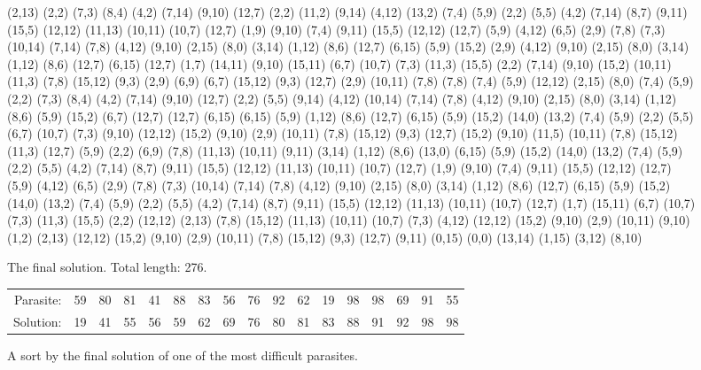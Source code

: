\documentclass[11pt]{article}
\begin{document}
\begin{figure}[H]
  \begin{adjustwidth}{.5in}{.5in}
    \begin{footnotesize}
      (2,13) (2,2) (7,3) (8,4) (4,2) (7,14) (9,10) (12,7) (2,2) (11,2) (9,14) (4,12) (13,2) (7,4) (5,9) (2,2) (5,5) (4,2) (7,14) (8,7) (9,11) (15,5) (12,12) (11,13) (10,11) (10,7) (12,7) (1,9) (9,10) (7,4) (9,11) (15,5) (12,12) (12,7) (5,9) (4,12) (6,5) (2,9) (7,8) (7,3) (10,14) (7,14) (7,8) (4,12) (9,10) (2,15) (8,0) (3,14) (1,12) (8,6) (12,7) (6,15) (5,9) (15,2) (2,9) (4,12) (9,10) (2,15) (8,0) (3,14) (1,12) (8,6) (12,7) (6,15) (12,7) (1,7) (14,11) (9,10) (15,11) (6,7) (10,7) (7,3) (11,3) (15,5) (2,2) (7,14) (9,10) (15,2) (10,11) (11,3) (7,8) (15,12) (9,3) (2,9) (6,9) (6,7) (15,12) (9,3) (12,7) (2,9) (10,11) (7,8) (7,8) (7,4) (5,9) (12,12) (2,15) (8,0) (7,4) (5,9) (2,2) (7,3) (8,4) (4,2) (7,14) (9,10) (12,7) (2,2) (5,5) (9,14) (4,12) (10,14) (7,14) (7,8) (4,12) (9,10) (2,15) (8,0) (3,14) (1,12) (8,6) (5,9) (15,2) (6,7) (12,7) (12,7) (6,15) (6,15) (5,9) (1,12) (8,6) (12,7) (6,15) (5,9) (15,2) (14,0) (13,2) (7,4) (5,9) (2,2) (5,5) (6,7) (10,7) (7,3) (9,10) (12,12) (15,2) (9,10) (2,9) (10,11) (7,8) (15,12) (9,3) (12,7) (15,2) (9,10) (11,5) (10,11) (7,8) (15,12) (11,3) (12,7) (5,9) (2,2) (6,9) (7,8) (11,13) (10,11) (9,11) (3,14) (1,12) (8,6) (13,0) (6,15) (5,9) (15,2) (14,0) (13,2) (7,4) (5,9) (2,2) (5,5) (4,2) (7,14) (8,7) (9,11) (15,5) (12,12) (11,13) (10,11) (10,7) (12,7) (1,9) (9,10) (7,4) (9,11) (15,5) (12,12) (12,7) (5,9) (4,12) (6,5) (2,9) (7,8) (7,3) (10,14) (7,14) (7,8) (4,12) (9,10) (2,15) (8,0) (3,14) (1,12) (8,6) (12,7) (6,15) (5,9) (15,2) (14,0) (13,2) (7,4) (5,9) (2,2) (5,5) (4,2) (7,14) (8,7) (9,11) (15,5) (12,12) (11,13) (10,11) (10,7) (12,7) (1,7) (15,11) (6,7) (10,7) (7,3) (11,3) (15,5) (2,2) (12,12) (2,13) (7,8) (15,12) (11,13) (10,11) (10,7) (7,3) (4,12) (12,12) (15,2) (9,10) (2,9) (10,11) (9,10) (1,2) (2,13) (12,12) (15,2) (9,10) (2,9) (10,11) (7,8) (15,12) (9,3) (12,7) (9,11) (0,15) (0,0) (13,14) (1,15) (3,12) (8,10)
    \end{footnotesize}
  \end{adjustwidth}
  \caption{The final solution. Total length: 276.}
\end{figure}

\begin{figure}[H]
  \begin{small}
    \begin{center}
      \begin{tabular}{rcccccccccccccccc}
        Parasite: & 59 & 80 & 81 & 41 & 88 & 83 & 56 & 76 & 92 & 62 & 19 & 98 & 98 & 69 & 91 & 55 \\
        Solution: & 19 & 41 & 55 & 56 & 59 & 62 & 69 & 76 & 80 & 81 & 83 & 88 & 91 & 92 & 98 & 98 \\
      \end{tabular}
    \end{center}
  \end{small}
  \caption{A sort by the final solution of one of the most difficult parasites.}
\end{figure}


\end{document}
